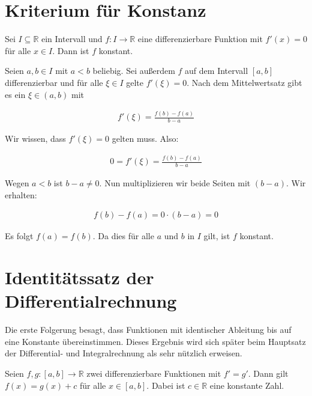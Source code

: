 \documentclass[fontsize=9pt,
               parskip=half-,
               DIV=14,
               listof=chapterentry,
               tocflat]{scrbook}
\begin{document}
\section{Kriterium für Konstanz}

\begin{theorem*}
Sei $I\subseteq \mathbb {R} $ ein Intervall und $f:I\to \mathbb {R} $ eine differenzierbare Funktion mit $f'(x)=0$ für alle $x\in I$. Dann ist $f$ konstant.

\end{theorem*}

\begin{proof*}
Seien $a,b\in I$ mit $a<b$ beliebig. Sei außerdem $f$ auf dem Intervall $[a,b]$ differenzierbar und für alle $\xi \in I$ gelte $f'(\xi )=0$. Nach dem Mittelwertsatz gibt es ein $\xi \in (a,b)$ mit

\begin{align*}
f'(\xi )={\frac {f(b)-f(a)}{b-a}}
\end{align*}

Wir wissen, dass $f'(\xi )=0$ gelten muss. Also:

\begin{align*}
0=f'(\xi )={\frac {f(b)-f(a)}{b-a}}
\end{align*}

Wegen $a<b$ ist $b-a\neq 0$. Nun multiplizieren wir beide Seiten mit $(b-a)$. Wir erhalten:

\begin{align*}
f(b)-f(a)=0\cdot (b-a)=0
\end{align*}

Es folgt $f(a)=f(b)$. Da dies für alle $a$ und $b$ in $I$ gilt, ist $f$ konstant.

\end{proof*}

\section{Identitätssatz der Differentialrechnung}

Die erste Folgerung besagt, dass Funktionen mit identischer Ableitung bis auf eine Konstante übereinstimmen. Dieses Ergebnis wird sich später beim Hauptsatz der Differential- und Integralrechnung als sehr nützlich erweisen.

\begin{theorem*}[Identitätssatz]
Seien $f,g:[a,b]\to \mathbb {R} $ zwei differenzierbare Funktionen mit $f'=g'$. Dann gilt $f(x)=g(x)+c$ für alle $x\in [a,b]$. Dabei ist $c\in \mathbb {R} $ eine konstante Zahl.

\end{theorem*}
\end{document}
